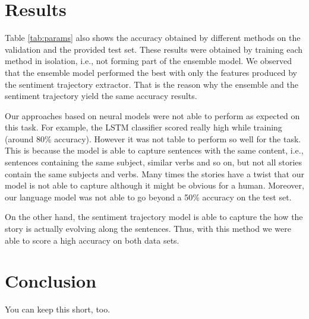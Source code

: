 \documentclass{article}
\newcommand{\lstm}{LSTM }
\begin{document}
\section{Results}
\label{sec:results}

Table \ref{tab:params} also shows the accuracy obtained by different methods on
the validation and the provided test set. These results were obtained by
training each method in isolation, i.e., not forming part of the ensemble model.
We observed that the ensemble model performed the best with only the features
produced by the sentiment trajectory extractor. That is the reason why the
ensemble and the sentiment trajectory yield the same accuracy results.



Our approaches based on neural models were not able to perform as expected on
this task. For example, the \lstm classifier scored really high while training
(around 80\% accuracy). However it was not table to perform so well for the
task. This is because the model is able to capture sentences with the same
content, i.e., sentences containing the same subject, similar verbs and so on,
but not all stories contain the same subjects and verbs. Many times the stories
have a twist that our model is not able to capture although it might be obvious
for a human. Moreover, our language model was not able to go beyond a 50\%
accuracy on the test set. 

On the other hand, the sentiment trajectory model is able to capture the how the
story is actually evolving along the sentences. Thus, with this method we were
able to score a high accuracy on both data sets.


\section{Conclusion}
You can keep this short, too. \cite{*}



\end{document}
